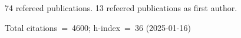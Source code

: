 74 refereed publications. 13 refeered publications as first author.

Total citations~=~4600; h-index~=~36 (2025-01-16)